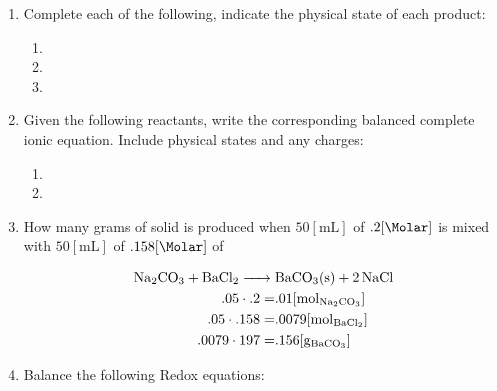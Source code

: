 \documentclass[12pt]{article}
\begin{document}
\begin{enumerate}
  \item Complete each of the following, indicate the physical state of each product:

    \begin{enumerate}

      \item {}

      \item {}

      \item {}

    \end{enumerate}

  \item Given the following reactants, write the corresponding balanced complete ionic equation. Include physical states and any charges:

    \begin{enumerate}

      \item {}

      \item {}

    \end{enumerate}

  \item How many grams of solid is produced when $50[\si{\milli\liter}]$ of $.2[\si{\Molar}]$  is mixed with $50[\si{\milli\liter}]$ of $.158[\si{\Molar}]$ of 

    \begin{equation}
      \begin{split}
        \ce{Na2CO3 + BaCl2 ->} & \ce{BaCO3(s) + 2NaCl}\\
        .05\cdot.2=&.01[\si{\mole}_{\ce{Na2CO3}}]\\
        .05\cdot.158=&.0079[\si{\mole}_{\ce{BaCl2}}]\\
        .0079\cdot197=&.156[\si{\gram}_{\ce{BaCO3}}]
      \end{split}
      \label{3}
    \end{equation}

  \item Balance the following Redox equations:


\end{enumerate}
\end{document}
